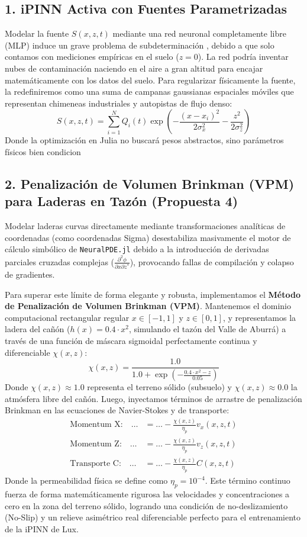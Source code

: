 \documentclass[11pt,a4paper]{article}
\begin{document}
\subsection{1. iPINN Activa con Fuentes Parametrizadas}
Modelar la fuente $S(x, z, t)$ mediante una red neuronal completamente libre (MLP) induce un grave problema de  subdeterminación , debido a que solo contamos con mediciones empíricas en el suelo ($z=0$). La red podría inventar nubes de contaminación naciendo en el aire a gran altitud para encajar matemáticamente con los datos del suelo.
Para regularizar físicamente la fuente, la redefiniremos como una suma de campanas gaussianas espaciales móviles que representan chimeneas industriales y autopistas de flujo denso:
\begin{equation}
S(x, z, t) = \sum_{i=1}^N Q_i(t) \exp\left(-\frac{(x - x_i)^2}{2\sigma_x^2} - \frac{z^2}{2\sigma_z^2}\right)
\end{equation}
Donde la optimización en Julia no buscará pesos abstractos, sino  parámetros físicos bien condicion\subsection{2. Penalización de Volumen Brinkman (VPM) para Laderas en Tazón (Propuesta 4)}
Modelar laderas curvas directamente mediante transformaciones analíticas de coordenadas (como coordenadas Sigma) desestabiliza masivamente el motor de cálculo simbólico de \texttt{NeuralPDE.jl} debido a la introducción de derivadas parciales cruzadas complejas ($\frac{\partial^2 \phi}{\partial x \partial z^*}$), provocando fallas de compilación y colapso de gradientes.

Para superar este límite de forma elegante y robusta, implementamos el \textbf{Método de Penalización de Volumen Brinkman (VPM)}. Mantenemos el dominio computacional rectangular regular $x \in [-1, 1]$ y $z \in [0, 1]$, y representamos la ladera del cañón ($h(x) = 0.4 \cdot x^2$, simulando el tazón del Valle de Aburrá) a través de una función de máscara sigmoidal perfectamente continua y diferenciable $\chi(x, z)$:
\begin{equation}
\chi(x, z) = \frac{1.0}{1.0 + \exp\left( -\frac{0.4 \cdot x^2 - z}{0.05} \right)}
\end{equation}
Donde $\chi(x, z) \approx 1.0$ representa el terreno sólido (subsuelo) y $\chi(x, z) \approx 0.0$ la atmósfera libre del cañón. Luego, inyectamos términos de arrastre de penalización Brinkman en las ecuaciones de Navier-Stokes y de transporte:
\begin{align}
\text{Momentum X:} \quad \dots &= \dots - \frac{\chi(x,z)}{\eta_p} v_x(x,z,t) \\
\text{Momentum Z:} \quad \dots &= \dots - \frac{\chi(x,z)}{\eta_p} v_z(x,z,t) \\
\text{Transporte C:} \quad \dots &= \dots - \frac{\chi(x,z)}{\eta_p} C(x,z,t)
\end{align}
Donde la permeabilidad física se define como $\eta_p = 10^{-4}$. Este término continuo fuerza de forma matemáticamente rigurosa las velocidades y concentraciones a cero en la zona del terreno sólido, logrando una condición de no-deslizamiento (No-Slip) y un relieve asimétrico real diferenciable perfecto para el entrenamiento de la iPINN de Lux.
\end{document}
